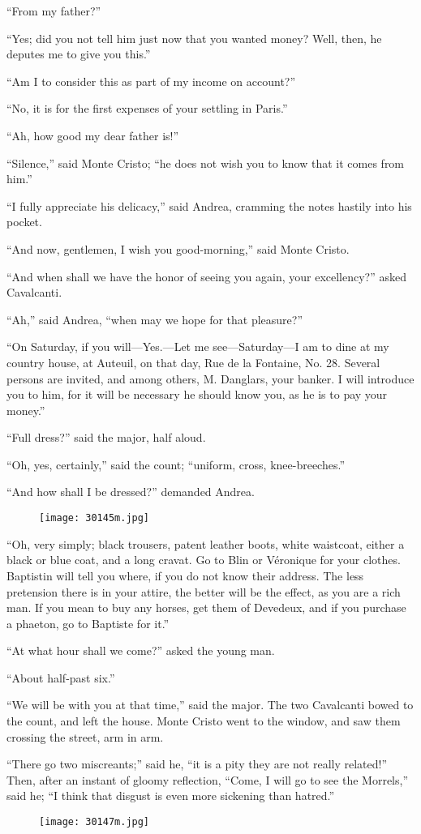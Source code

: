 “From my father?”

“Yes; did you not tell him just now that you wanted money? Well, then,
he deputes me to give you this.”

“Am I to consider this as part of my income on account?”

“No, it is for the first expenses of your settling in Paris.”

“Ah, how good my dear father is!”

“Silence,” said Monte Cristo; “he does not wish you to know that it
comes from him.”

“I fully appreciate his delicacy,” said Andrea, cramming the notes
hastily into his pocket.

“And now, gentlemen, I wish you good-morning,” said Monte Cristo.

“And when shall we have the honor of seeing you again, your
excellency?” asked Cavalcanti.

“Ah,” said Andrea, “when may we hope for that pleasure?”

“On Saturday, if you will—Yes.—Let me see—Saturday—I am to dine at my
country house, at Auteuil, on that day, Rue de la Fontaine, No. 28.
Several persons are invited, and among others, M. Danglars, your
banker. I will introduce you to him, for it will be necessary he should
know you, as he is to pay your money.”

“Full dress?” said the major, half aloud.

“Oh, yes, certainly,” said the count; “uniform, cross, knee-breeches.”

“And how shall I be dressed?” demanded Andrea.

\begin{figure}[ht]
\texttt{[image: 30145m.jpg]}
\end{figure}

“Oh, very simply; black trousers, patent leather boots, white
waistcoat, either a black or blue coat, and a long cravat. Go to Blin
or Véronique for your clothes. Baptistin will tell you where, if you do
not know their address. The less pretension there is in your attire,
the better will be the effect, as you are a rich man. If you mean to
buy any horses, get them of Devedeux, and if you purchase a phaeton, go
to Baptiste for it.”

“At what hour shall we come?” asked the young man.

“About half-past six.”

“We will be with you at that time,” said the major. The two Cavalcanti
bowed to the count, and left the house. Monte Cristo went to the
window, and saw them crossing the street, arm in arm.

“There go two miscreants;” said he, “it is a pity they are not really
related!” Then, after an instant of gloomy reflection, “Come, I will go
to see the Morrels,” said he; “I think that disgust is even more
sickening than hatred.”

\begin{figure}[ht]
\texttt{[image: 30147m.jpg]}
\end{figure}
